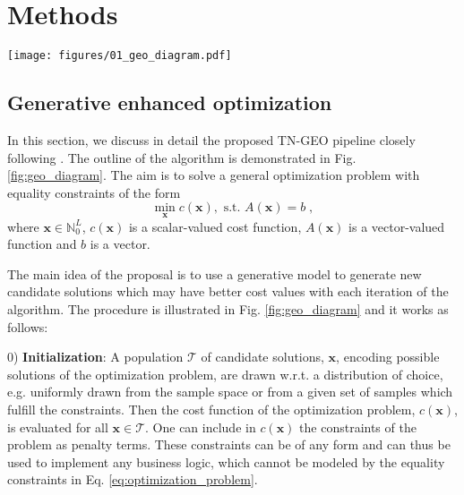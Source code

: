 \section{Methods}

\begin{figure*}[!htbp]
    \centering
    \texttt{[image: figures/01\_geo\_diagram.pdf]}
    \caption{GEO pipeline. The process begins with the initial pairs of observations and their costs (step 0) and proceeds by selecting candidates for the training dataset (step 1) according to a selection strategy of choice. After selecting the candidates, the model computes a probability function $p(\mathbf{x})$ (step 2), followed by training the generative model (step 3). New samples are generated based on the trained model (step 4) and are then combined with the original training set (step 5). The updated training set is used for further iterations, continuing the loop for model refinement.}
    \label{fig:geo_diagram}
\end{figure*}

\subsection{Generative enhanced optimization}\label{sec:geo}
In this section, we discuss in detail the proposed TN-GEO pipeline closely following \cite{Alcazar2024,lopezpiqueres2023symmetric}. The outline of the algorithm is demonstrated in Fig. \ref{fig:geo_diagram}.
The aim is to solve a general optimization problem with equality constraints of the form 
\begin{equation}
  \min_\mathbf{x} c(\mathbf{x}),\,\, \text{s.t.  } A(\mathbf{x})= b  \;, \label{eq:optimization_problem}
\end{equation}
where $\mathbf{x}\in{\mathbb{N}}^L_0$, $c(\mathbf{x})$ is a scalar-valued cost function, $A(\mathbf{x})$ is a vector-valued function and $b$ is a vector. 

The main idea of the proposal is to use a generative model to generate new candidate solutions which may have better cost values with each iteration of the algorithm. The procedure is illustrated in Fig. \ref{fig:geo_diagram} and it works as follows: 

0) \textbf{Initialization}: A population $\mathcal {T}$ of candidate solutions, $\mathbf{x}$, encoding possible solutions of the optimization problem, are drawn w.r.t. a distribution of choice, e.g. uniformly drawn from the sample space or from a given set of samples which fulfill the constraints. Then the cost function of the optimization problem, $c(\mathbf{x})$, is evaluated for all $\mathbf{x}\in \mathcal {T}$. One can include in $c(\mathbf{x})$ the constraints of the problem as penalty terms. These constraints can be of any form and can thus be used to implement any business logic, which cannot be modeled by the equality constraints in Eq. \eqref{eq:optimization_problem}.


